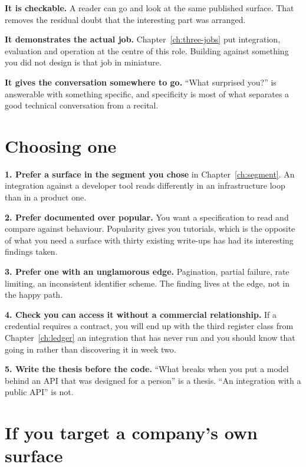 \textbf{It is checkable.} A reader can go and look at the same published
surface. That removes the residual doubt that the interesting part was arranged.

\textbf{It demonstrates the actual job.} Chapter~\ref{ch:three-jobs} put
integration, evaluation and operation at the centre of this role. Building
against something you did not design is that job in miniature.

\textbf{It gives the conversation somewhere to go.} ``What surprised you?'' is
answerable with something specific, and specificity is most of what separates a
good technical conversation from a recital.

\section{Choosing one}

\begin{kitmethod}
\textbf{1. Prefer a surface in the segment you chose} in Chapter~\ref{ch:segment}.
An integration against a developer tool reads differently in an infrastructure
loop than in a product one.

\textbf{2. Prefer documented over popular.} You want a specification to read and
compare against behaviour. Popularity gives you tutorials, which is the
opposite of what you need \dash{} a surface with thirty existing write-ups has
had its interesting findings taken.

\textbf{3. Prefer one with an unglamorous edge.} Pagination, partial failure,
rate limiting, an inconsistent identifier scheme. The finding lives at the edge,
not in the happy path.

\textbf{4. Check you can access it without a commercial relationship.} If a
credential requires a contract, you will end up with the third register class
from Chapter~\ref{ch:ledger} \dash{} an integration that has never run \dash{}
and you should know that going in rather than discovering it in week two.

\textbf{5. Write the thesis before the code.} ``What breaks when you put a model
behind an API that was designed for a person'' is a thesis. ``An integration
with a public API'' is not.
\end{kitmethod}

\section{If you target a company's own surface}

